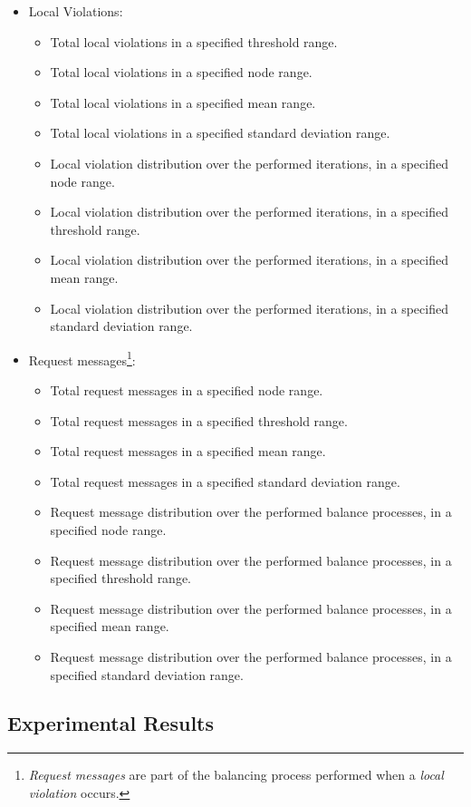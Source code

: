 \documentclass{article}
\begin{document}
\begin{itemize}
			\item Local Violations:
			\begin{itemize}
				\item Total local violations in a specified threshold range.
				\item Total local violations in a specified node range.
				\item Total local violations in a specified mean range.
				\item Total local violations in a specified standard deviation range.
				\item Local violation distribution over the performed iterations, in a specified node range.
				\item Local violation distribution over the performed iterations, in a specified threshold range.
				\item Local violation distribution over the performed iterations, in a specified mean range.
				\item Local violation distribution over the performed iterations, in a specified standard deviation range.			
			\end{itemize}
			\item Request messages\footnote{\emph{Request messages} are part of the balancing process performed when a \emph{local violation} occurs.}:
			\begin{itemize}
				\item Total request messages in a specified node range.
				\item Total request messages in a specified threshold range.
				\item Total request messages in a specified mean range.
				\item Total request messages in a specified standard deviation range.
				\item Request message distribution over the performed balance processes, in a specified node range.
				\item Request message distribution over the performed balance processes, in a specified threshold range.
				\item Request message distribution over the performed balance processes, in a specified mean range.
				\item Request message distribution over the performed balance processes, in a specified standard deviation range.
			\end{itemize}				
			\end{itemize}
			
	\subsection{Experimental Results}
	
\end{document}
